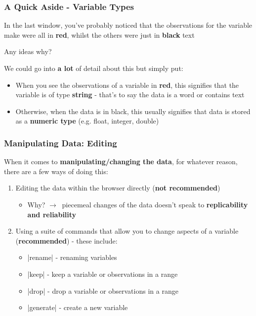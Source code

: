\documentclass[10pt, compress]{beamer}
\begin{document}
\begin{frame}[fragile]
\frametitle{A Quick Aside - Variable Types}
In the last window, you've probably noticed that the observations for the variable \alert{make} were all in \textbf{red}, whilst the others were just in \textbf{black} text

\begin{center}
\alert{Any ideas why?}	
\end{center}

We could go into \textbf{a lot} of detail about this but simply put:
\begin{itemize}
	\item When you see the observations of a variable in \textbf{red}, this signifies that the variable is of type \textbf{string} - that's to say the data is a word or contains text
	\item Otherwise, when the data is in black, this usually signifies that data is stored as a \textbf{numeric type} (e.g. \alert{float, integer, double})
\end{itemize}

\end{frame}

\begin{frame}[fragile]
\frametitle{Manipulating Data: Editing}
When it comes to \textbf{manipulating/changing the data}, for whatever reason, there are a few ways of doing this:

\begin{enumerate}
\item Editing the data within the browser directly (\textbf{not recommended})
\begin{itemize}
\item \alert{Why?} $ \to\ $ piecemeal changes of the data doesn't speak to \textbf{replicability and reliability}
\end{itemize}
\item Using a suite of commands that allow you to change aspects of a variable (\textbf{recommended}) - these include: 
\begin{itemize}
\item {}|rename| - renaming variables
\item {}|keep| - keep a variable or observations in a range
\item {}|drop| - drop a variable or observations in a range
\item {}|generate| - create a new variable
\end{itemize}
\end{enumerate}

\end{frame}
\end{document}
